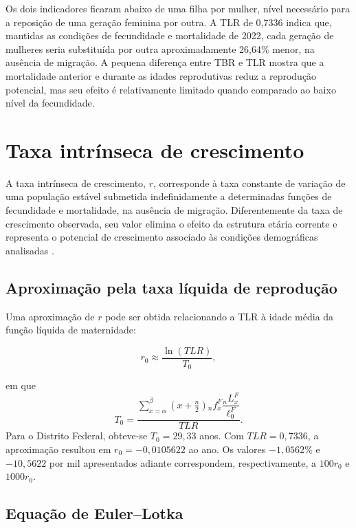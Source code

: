 \documentclass[a4paper,12pt]{article}
\begin{document}
Os dois indicadores ficaram abaixo de uma filha por mulher, nível necessário para a reposição de 
uma geração feminina por outra. A TLR de 0,7336 indica que, mantidas as condições de fecundidade 
e mortalidade de 2022, cada geração de mulheres seria substituída por outra aproximadamente 
26,64\% menor, na ausência de migração. A pequena diferença entre TBR e TLR mostra que a mortalidade anterior e durante as idades reprodutivas reduz a reprodução potencial, mas seu efeito é relativamente limitado quando comparado ao baixo nível da fecundidade.


\section{Taxa intrínseca de crescimento}

A taxa intrínseca de crescimento, \(r\), corresponde à taxa constante de variação de uma população estável submetida indefinidamente a determinadas funções de fecundidade e mortalidade, na ausência de migração. Diferentemente da taxa de crescimento observada, seu valor elimina o efeito da estrutura etária corrente e representa o potencial de crescimento associado às condições demográficas analisadas \cite{grupofoz2021,preston2001}.

\subsection{Aproximação pela taxa líquida de reprodução}

Uma aproximação de \(r\) pode ser obtida relacionando a TLR à idade média da função líquida de maternidade:

\begin{equation}
r_0 \approx \frac{\ln(TLR)}{T_0},
\end{equation}

\noindent em que
\begin{equation}
T_0=\frac{\displaystyle\sum_{x=\alpha}^{\beta}
\left(x+\frac{n}{2}\right){}_nf_x^F
\dfrac{{}_nL_x^F}{\ell_0^F}}{TLR}.
\end{equation}
Para o Distrito Federal, obteve-se \(T_0=29{,}33\) anos. Com \(TLR=0{,}7336\), a aproximação resultou em \(r_0=-0{,}0105622\) ao ano. Os valores \(-1{,}0562\%\) e \(-10{,}5622\) por mil apresentados adiante correspondem, respectivamente, a \(100r_0\) e \(1000r_0\).

\subsection{Equação de Euler--Lotka}
\end{document}
